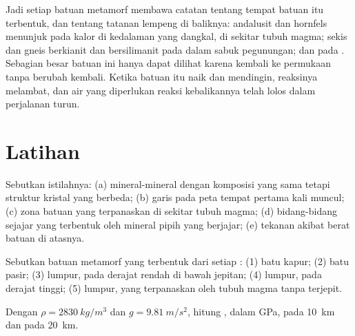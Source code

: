 Jadi setiap batuan metamorf membawa catatan tentang  tempat batuan itu
terbentuk, dan tentang tatanan lempeng di baliknya: andalusit dan hornfels
menunjuk pada kalor di kedalaman yang dangkal, di sekitar tubuh magma; sekis dan
gneis berkianit dan bersilimanit pada  dalam sabuk pegunungan;  dan  pada . Sebagian besar batuan ini hanya dapat
dilihat karena kembali ke permukaan tanpa berubah kembali. Ketika batuan itu
naik dan mendingin, reaksinya melambat, dan air yang diperlukan reaksi
kebalikannya telah lolos dalam perjalanan turun.

\section{Latihan}

\begin{exercise}[$\star$]\label{exo:g12:metamorphic-rocks:1}
Sebutkan istilahnya: (a) mineral-mineral dengan komposisi yang sama tetapi
struktur kristal yang berbeda; (b) garis pada peta tempat 
pertama kali muncul; (c) zona batuan yang terpanaskan di sekitar tubuh magma;
(d) bidang-bidang sejajar yang terbentuk oleh mineral pipih yang berjajar;
(e) tekanan akibat berat batuan di atasnya.
\end{exercise}

\begin{exercise}[$\star$]\label{exo:g12:metamorphic-rocks:2}
Sebutkan batuan metamorf yang terbentuk dari setiap : (1) batu
kapur; (2) batu pasir; (3) lumpur, pada derajat rendah di bawah jepitan;
(4) lumpur, pada derajat tinggi; (5) lumpur, yang terpanaskan oleh tubuh magma
tanpa terjepit.
\end{exercise}

\begin{exercise}[$\star$]\label{exo:g12:metamorphic-rocks:3}
Dengan $\rho = \qty{2830}{kg/m^3}$ dan $g = \qty{9.81}{m/s^2}$, hitung , dalam \unit{GPa}, pada \qty{10}{km} dan pada \qty{20}{km}.
\end{exercise}

